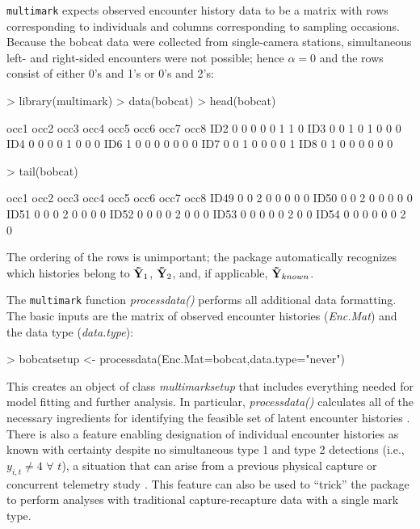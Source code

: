 \documentclass[12pt]{article}
\begin{document}
\verb|multimark| expects observed encounter history data to be a matrix with rows corresponding to individuals and columns corresponding to sampling occasions. Because the bobcat data were collected from single-camera stations, simultaneous left- and right-sided encounters were not possible; hence $\alpha=0$ and the rows consist of either 0's and 1's or 0's and 2's:
\begin{Schunk}
\begin{Sinput}
> library(multimark)
> data(bobcat)
> head(bobcat)
\end{Sinput}
\begin{Soutput}
    occ1 occ2 occ3 occ4 occ5 occ6 occ7 occ8
ID2    0    0    0    0    0    1    1    0
ID3    0    0    1    0    1    0    0    0
ID4    0    0    0    0    1    0    0    0
ID6    1    0    0    0    0    0    0    0
ID7    0    0    1    0    0    0    0    1
ID8    0    1    0    0    0    0    0    0
\end{Soutput}
\begin{Sinput}
> tail(bobcat)
\end{Sinput}
\begin{Soutput}
     occ1 occ2 occ3 occ4 occ5 occ6 occ7 occ8
ID49    0    0    2    0    0    0    0    0
ID50    0    0    2    0    0    0    0    0
ID51    0    0    0    2    0    0    0    0
ID52    0    0    0    0    2    0    0    0
ID53    0    0    0    0    0    2    0    0
ID54    0    0    0    0    0    0    2    0
\end{Soutput}
\end{Schunk}
The ordering of the rows is unimportant; the package automatically recognizes which histories belong to ${\bf {\tilde Y}}_1$, ${\bf {\tilde Y}}_2$, and, if applicable, ${\bf {\tilde Y}}_{known}$.

The \verb|multimark| function \textit{processdata()} performs all additional data formatting. The basic inputs are the matrix of observed encounter histories (\textit{Enc.Mat}) and the data type (\textit{data.type}):
\begin{Schunk}
\begin{Sinput}
> bobcatsetup <- processdata(Enc.Mat=bobcat,data.type="never")
\end{Sinput}
\end{Schunk}
This creates an object of class \textit{multimarksetup} that includes everything needed for model fitting and further analysis. In particular, \textit{processdata()} calculates all of the necessary ingredients for identifying the feasible set of latent encounter histories \citep[for technical details see][]{BonnerHolmberg2013,McClintockEtAl2013a}. There is also a feature enabling designation of individual encounter histories as known with certainty despite no simultaneous type 1 and type 2 detections (i.e., $y_{i,t} \ne 4$ $\forall$ $t$), a situation that can arise from a previous physical capture or concurrent telemetry study \citep[e.g.,][]{McClintockEtAl2013a}. This feature can also be used to ``trick'' the package to perform analyses with traditional capture-recapture data with a single mark type.
\end{document}

